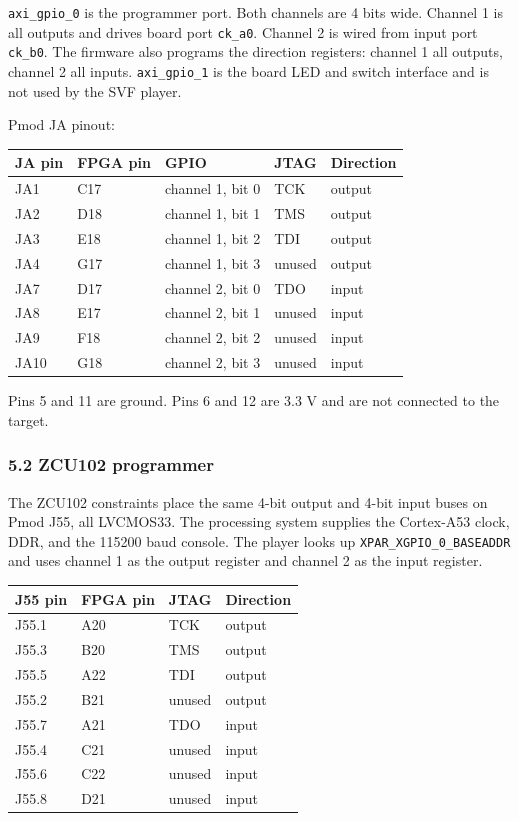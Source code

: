 \documentclass[
  11pt,
  a4paper,
]{article}
\newcounter{none} %
\begin{document}
\texttt{axi\_gpio\_0} is the programmer port. Both channels are 4 bits
wide. Channel 1 is all outputs and drives board port \texttt{ck\_a0}.
Channel 2 is wired from input port \texttt{ck\_b0}. The firmware also
programs the direction registers: channel 1 all outputs, channel 2 all
inputs. \texttt{axi\_gpio\_1} is the board LED and switch interface and
is not used by the SVF player.

Pmod JA pinout:

{\def\LTcaptype{none} %
\begin{longtable}[]{@{}lllll@{}}
\toprule\noalign{}
JA pin & FPGA pin & GPIO & JTAG & Direction \\
\midrule\noalign{}
\endhead
\bottomrule\noalign{}
\endlastfoot
JA1 & C17 & channel 1, bit 0 & TCK & output \\
JA2 & D18 & channel 1, bit 1 & TMS & output \\
JA3 & E18 & channel 1, bit 2 & TDI & output \\
JA4 & G17 & channel 1, bit 3 & unused & output \\
JA7 & D17 & channel 2, bit 0 & TDO & input \\
JA8 & E17 & channel 2, bit 1 & unused & input \\
JA9 & F18 & channel 2, bit 2 & unused & input \\
JA10 & G18 & channel 2, bit 3 & unused & input \\
\end{longtable}
}

Pins 5 and 11 are ground. Pins 6 and 12 are 3.3 V and are not connected
to the target.

\subsubsection{5.2 ZCU102 programmer}\label{zcu102-programmer}

The ZCU102 constraints place the same 4-bit output and 4-bit input buses
on Pmod J55, all LVCMOS33. The processing system supplies the Cortex-A53
clock, DDR, and the 115200 baud console. The player looks up
\texttt{XPAR\_XGPIO\_0\_BASEADDR} and uses channel 1 as the output
register and channel 2 as the input register.

{\def\LTcaptype{none} %
\begin{longtable}[]{@{}llll@{}}
\toprule\noalign{}
J55 pin & FPGA pin & JTAG & Direction \\
\midrule\noalign{}
\endhead
\bottomrule\noalign{}
\endlastfoot
J55.1 & A20 & TCK & output \\
J55.3 & B20 & TMS & output \\
J55.5 & A22 & TDI & output \\
J55.2 & B21 & unused & output \\
J55.7 & A21 & TDO & input \\
J55.4 & C21 & unused & input \\
J55.6 & C22 & unused & input \\
J55.8 & D21 & unused & input \\
\end{longtable}
}
\end{document}
